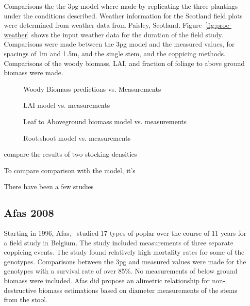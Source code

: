\documentclass[10pt]{article}
\begin{document}
Comparisons the the \ac{3pg} model where made by replicating the three
plantings under the conditions described.  Weather information for the
Scotland field plots were determined from weather data from Paisley,
Scotland.  Figure~\ref{fig:proe-weather} shows the input weather data
for the duration of the field study.  Comparisons were made between
the \ac{3pg} model and the measured values, for spacings of 1m and
1.5m, and the single stem, and the coppicing methods.  Comparisons of
the woody biomass, \ac{LAI}, and fraction of foliage to above ground
biomass were made.

\begin{figure}
  \centering
  
  \caption{Woody Biomass predictions vs. Measurements}
  \label{fig:proe-wood}
\end{figure}

\begin{figure}[!ht]
  \centering
    
  \caption{\ac{LAI} model vs. measurements}
  \label{fig:proe-light}
\end{figure}

\begin{figure}[!ht]
  \centering
    
  \caption{Leaf to Aboveground biomass model vs. measurements}
  \label{fig:proe-leaf}
\end{figure}

\begin{figure}[!ht]
  \centering
    
  \caption{Root:shoot model vs. measurements}
  \label{fig:proe-rootshoot}
\end{figure}

\cite{proe02} compare the results of two stocking densities

To compare comparison with the
model, it's 

There have been a few studies



\subsection*{Afas 2008}
\label{afas2008}

Starting in 1996, Afas,~\cite{Afas2008a} studied 17 types of poplar
over the course of 11 years for a field study in Belgium.  The study
included measurements of three separate coppicing events.  The study
found relatively high mortality rates for some of the genotypes.
Comparisons between the \ac{3pg} and measured values were made for the
genotypes with a survival rate of over 85\%.  No measurements of below
ground biomass were included.  Afas did propose an alimetric
relationship for non-destructive biomass estimations based on diameter
measurements of the stems from the stool.
\end{document}
